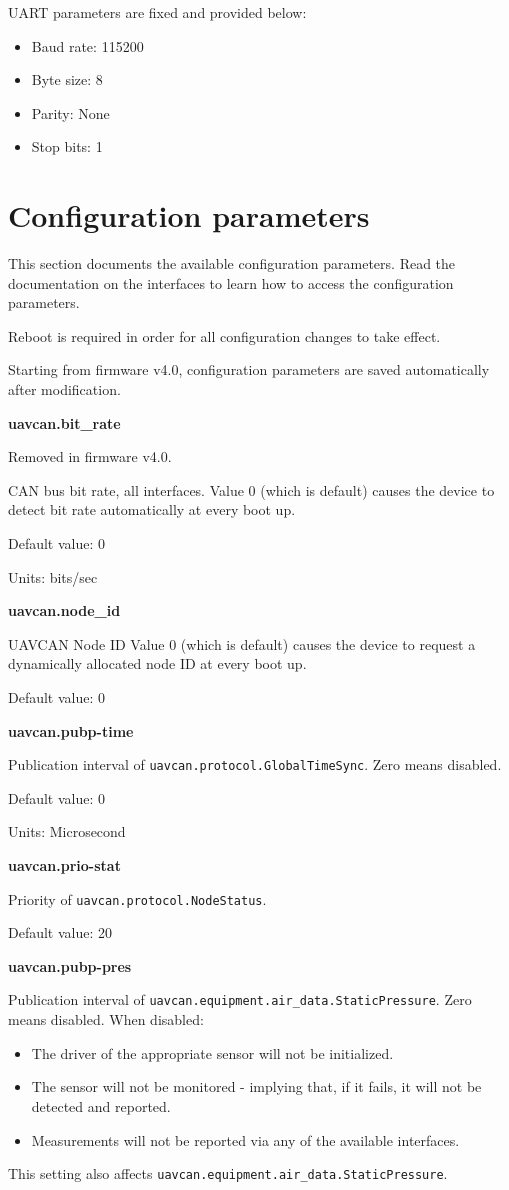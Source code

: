 \documentclass{zubaxdoc}
\begin{document}
UART parameters are fixed and provided below:
\begin{itemize}
\item Baud rate: 115200
\item Byte size: 8
\item Parity: None
\item Stop bits: 1
\end{itemize}

\chapter{Configuration parameters}

This section documents the available configuration parameters. Read the documentation on the interfaces to learn how to access the configuration parameters.

Reboot is required in order for all configuration changes to take effect.

Starting from firmware v4.0, configuration parameters are saved automatically after modification.

\textbf{uavcan.bit{\_}rate}

Removed in firmware v4.0.

CAN bus bit rate, all interfaces. Value 0 (which is default) causes the device to detect bit rate automatically at every boot up.

Default value: 0

Units: bits/sec

\textbf{uavcan.node{\_}id}

UAVCAN Node ID Value 0 (which is default) causes the device to request a dynamically allocated node ID at every boot up.

Default value: 0

\textbf{uavcan.pubp-time}

Publication interval of \texttt{uavcan.protocol.GlobalTimeSync}. Zero means disabled.

Default value: 0

Units: Microsecond

\textbf{uavcan.prio-stat}

Priority of \texttt{uavcan.protocol.NodeStatus}.

Default value: 20

\textbf{uavcan.pubp-pres}

Publication interval of \texttt{uavcan.equipment.air{\_}data.StaticPressure}. Zero means disabled. When disabled:
\begin{itemize}
\item The driver of the appropriate sensor will not be initialized.
\item The sensor will not be monitored - implying that, if it fails, it will not be detected and reported.
\item Measurements will not be reported via any of the available interfaces.
\end{itemize}
This setting also affects \texttt{uavcan.equipment.air{\_}data.StaticPressure}.
\end{document}
